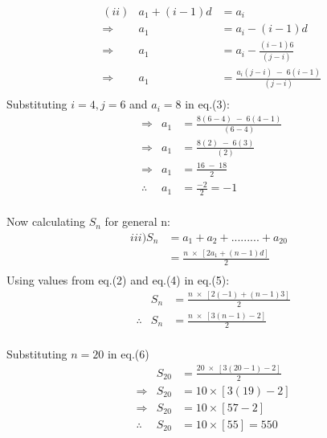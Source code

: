 \documentclass[journal, 12pt, twocolumn]{IEEEtran}
\begin{document}
    
     \begin{align*}
        &(ii)&a_1 + (i-1)d &= a_i\\
        &\Rightarrow & a_1 &= a_i - (i-1)d\\
        &\Rightarrow & a_1 &=  a_i - \tfrac{(i-1)6}{(j-i)} \;\;\;\\ 
        &\Rightarrow & a_1 &=  \tfrac{a_i(j-i)\;-\;6(i-1)}{(j-i)} \tag{3}\;\\
         \end{align*}
Substituting $i=4,j=6$ and $a_i=8$ in eq.(3):
\begin{align*}
    &\Rightarrow & a_1 &=  \tfrac{8(6-4)\;-\;6(4-1)}{(6-4)} \;\\
         &\Rightarrow & a_1 &=  \tfrac{8(2)\;-\;6(3)}{(2)} \;\\
         &\Rightarrow & a_1 &=  \tfrac{16\;-\;18}{2} \\ 
          &\therefore &  a_1 &=\tfrac{-2}{2} = -1 \tag{4}\\
\end{align*}         
    
Now calculating $S_n$ for general n:   
    \begin{align*}
        iii)  S_{n} &= a_1 + a_2 + ......... + a_{20}\\
               &= \tfrac{n\;\times\;\left[2a_1 + (n-1)d\right]}{2} \tag{5}\\
    \end{align*} 
Using values from eq.(2) and eq.(4) in eq.(5):
\begin{align*}
    &  & S_{n}  &= \tfrac{n\;\times\;\left[2(-1) + (n-1)3\right]}{2}\\
   &  \therefore  & S_n  &=  \tfrac{n\;\times\;\left[3(n-1) - 2\right]}{2}\tag{6}\\
\end{align*}

Substituting $n=20$ in eq.(6) 
 \begin{align*}
    &  & S_{20}  &= \tfrac{20\;\times\;\left[3(20-1) - 2\right]}{2}\\
   &  \Rightarrow  & S_{20}  &=  10\times[3(19)-2]\\
   &  \Rightarrow  & S_{20}  &=  10\times[57-2]\\
   &  \therefore  & S_{20}  &=  10\times[55] = 550
\end{align*}

    
    
\end{document}
